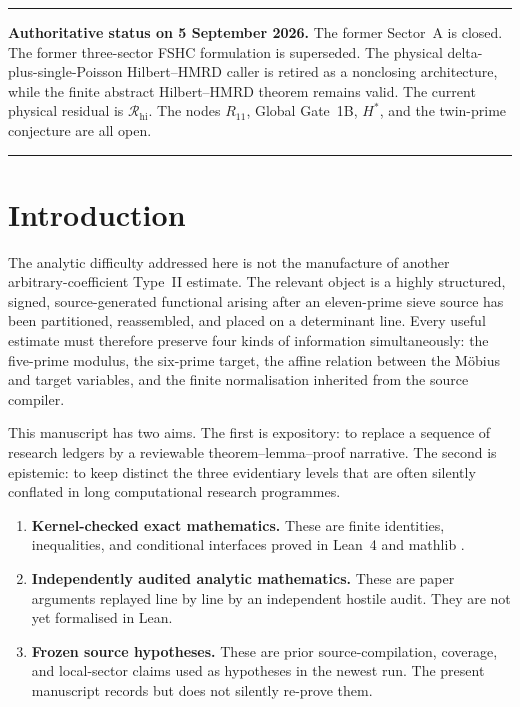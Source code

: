 \documentclass[11pt,reqno]{amsart}
\numberwithin{equation}{section}
\theoremstyle{definition}
\theoremstyle{remark}
\newcommand{\1}{\mathbf 1}
\newcommand{\RR}{\mathcal R}
\newcommand{\Rhi}{\RR_{\mathrm{hi}}}
\newenvironment{statusbox}{%
  \par\medskip\noindent\begin{minipage}{\textwidth}\hrule\medskip\small
}{%
  \par\medskip\hrule\end{minipage}\par\medskip
}
\begin{document}
\maketitle

\begin{statusbox}
\textbf{Authoritative status on 5 September 2026.}
The former Sector~A is closed.  The former three-sector FSHC formulation is
superseded.  The physical delta-plus-single-Poisson Hilbert--HMRD caller is
retired as a nonclosing architecture, while the finite abstract Hilbert--HMRD
theorem remains valid.  The current physical residual is $\Rhi$.  The nodes
$R_{11}$, Global Gate~1B, $H^*$, and the twin-prime conjecture are all open.
\end{statusbox}

\tableofcontents

\section{Introduction}

The analytic difficulty addressed here is not the manufacture of another
arbitrary-coefficient Type~II estimate.  The relevant object is a highly
structured, signed, source-generated functional arising after an eleven-prime
sieve source has been partitioned, reassembled, and placed on a determinant
line.  Every useful estimate must therefore preserve four kinds of information
simultaneously: the five-prime modulus, the six-prime target, the affine relation
between the M\"obius and target variables, and the finite normalisation inherited
from the source compiler.

This manuscript has two aims.  The first is expository: to replace a sequence
of research ledgers by a reviewable theorem--lemma--proof narrative.  The second
is epistemic: to keep distinct the three evidentiary levels that are often
silently conflated in long computational research programmes.

\begin{enumerate}[label=\textup{(E\arabic*)},leftmargin=3em]
\item \textbf{Kernel-checked exact mathematics.}  These are finite identities,
      inequalities, and conditional interfaces proved in Lean~4 and mathlib
      \cite{Lean4CADE2021,Mathlib2020}.
\item \textbf{Independently audited analytic mathematics.}  These are paper
      arguments replayed line by line by an independent hostile audit.  They
      are not yet formalised in Lean.
\item \textbf{Frozen source hypotheses.}  These are prior source-compilation,
      coverage, and local-sector claims used as hypotheses in the newest run.
      The present manuscript records but does not silently re-prove them.
\end{enumerate}
\end{document}
